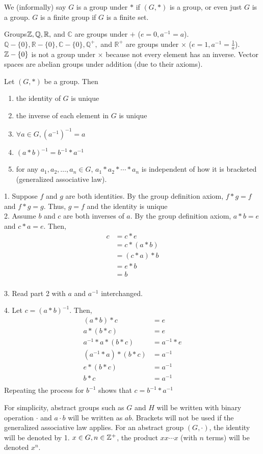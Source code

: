 \documentclass{report}
\newcommand{\mprop}[2]{\begin{Prop}{#1}{}#2\end{Prop}}
\newcommand{\ex}[2]{\begin{Example}{#1}{}#2\end{Example}}
\newcommand{\nt}[1]{\begin{note}#1\end{note}}
\newenvironment{myproof}[1][\proofname]{%
	\proof[\bfseries #1: ]%
}{\endproof}
\newcommand{\bbC}{\mathbb{C}}	\newcommand{\bbD}{\mathbb{D}}
\newcommand{\bbQ}{\mathbb{Q}}	\newcommand{\bbR}{\mathbb{R}}
\begin{document}
\nt{We (informally) say $G$ is a group under $*$ if $(G, *)$ is a group, or even just $G$ is a group. $G$ is a finite group if $G$ is a finite set. }
\ex{Groups}{$\bbZ, \bbQ, \bbR,$ and $\bbC$ are groups under $+$ ($e = 0, a^{-1} = a$). $\bbQ - \{0\},\bbR - \{0\},\bbC - \{0\},\bbQ^+,$ and $\bbR^+$ are groups under $\times$ ($e = 1, a^{-1} = \frac{1}{a}$). $\mathbb{Z} - \{0\}$ is not a group under $\times$ because not every element has an inverse. Vector spaces are abelian groups under addition (due to their axioms).}
\mprop{}{Let $(G, *)$ be a group. Then \begin{enumerate}
    \item the identity of $G$ is unique
    \item the inverse of each element in $G$ is unique
    \item $\forall a \in G, (a^{-1})^{-1} = a$
    \item $(a * b)^{-1} = b^{-1} * a^{-1}$
    \item for any $a_1, a_2, \dots , a_n \in G$, $a_1 * a_2 * \cdots * a_n$ is independent of how it is bracketed (generalized associative law).
\end{enumerate}}
\begin{myproof}
    
    1. Suppose $f$ and $g$ are both identities. By the group definition axiom, $f * g = f$ and $f * g = g$. Thus, $g = f$ and the identity is unique\\
    
    2. Assume $b$ and $c$ are both inverses of $a$. By the group definition axiom, $a*b = e$ and $c * a = e$. Then, 
    \begin{align*}
        c & =c*e \\
            & =c*(a*b)\\
            & =(c*a)*b\\
            & =e*b\\
            &=b \\
    \end{align*}

    3. Read part 2 with $a$ and $a^{-1}$ interchanged. 

    4. Let $c = (a*b)^{-1}$. Then, 
    \begin{align*}
        (a*b)*c&=e \\
        a*(b*c)&=e \\
        a^{-1}* a*(b*c)&=a^{-1}*e \\
        (a^{-1}*a)*(b*c)&= a^{-1} \\
        e*(b*c)&=a^{-1} \\
        b*c &= a^{-1} \\
    \end{align*}
    Repeating the process for $b^{-1}$ shows that $c=b^{-1}*a^{-1}$
\end{myproof}
\nt{For simplicity, abstract groups such as $G$ and $H$ will be written with binary operation $\cdot$ and $a \cdot b$ will be written as $ab$. Brackets will not be used if the generalized associative law applies. For an abstract group $(G, \cdot)$, the identity will be denoted by 1. $x \in G, n \in \mathbb{Z}^+$, the product $xx\cdots x$ (with $n$ terms) will be denoted $x^n$. }
\end{document}

